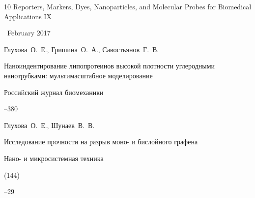 \begin{thebibliography}{10}
\volinfo Reporters, Markers, Dyes, Nanoparticles, and Molecular Probes for Biomedical Applications IX


~February 2017








\by Глухова~О.~Е., Гришина~О.~А., Савостьянов~Г.~В.

\paper Наноиндентирование липопротеинов высокой плотности углеродными нанотрубками: мультимасштабное моделирование

\jour Российский журнал биомеханики




--380














\by Глухова~О.~Е., Шунаев~В.~В.

\paper Исследование прочности на разрыв моно- и бислойного графена

\jour Нано- и микросистемная техника


(144)

--29












\end{thebibliography}





